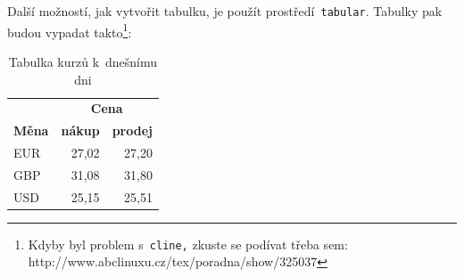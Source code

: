 \documentclass[a4paper,11pt]{article}
\begin{document}
Další možností, jak vytvořit tabulku, je použít prostředí\texttt{ tabular}. Tabulky pak budou vypadat takto\footnote{Kdyby byl problem s\texttt{ cline,} zkuste se podívat třeba sem: 
http://www.abclinuxu.cz/tex/poradna/show/325037}:
\bigskip
\begin{table}[h]
\begin{center}
\begin{tabular}{| l | r | r |} \hline
& \multicolumn{2}{c|}{\textbf{Cena}} \\ \cline{2-3}
\textbf{Měna} & \textbf{nákup} & \textbf{prodej} \\ \hline
EUR & 27,02 & 27,20 \\
GBP & 31,08 & 31,80 \\
USD & 25,15 & 25,51 \\ \hline
\end{tabular}
\caption{Tabulka kurzů k~dnešnímu dni}
\label{tab:kurzy}
\end{center}
\end{table}
\end{document}
